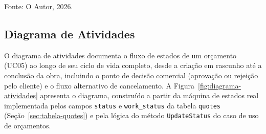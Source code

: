 \begin{figure}[H]
{
}
\end{figure}
{\centering\small Fonte: O Autor, 2026.\par}
\vspace{0.8em}

\subsection{Diagrama de Atividades}
\label{sec:diagrama-atividades}

O diagrama de atividades documenta o fluxo de estados de um orçamento (UC05) ao longo de seu ciclo de vida completo, desde a criação em rascunho até a conclusão da obra, incluindo o ponto de decisão comercial (aprovação ou rejeição pelo cliente) e o fluxo alternativo de cancelamento. A Figura~\ref{fig:diagrama-atividades} apresenta o diagrama, construído a partir da máquina de estados real implementada pelos campos \texttt{status} e \texttt{work\_status} da tabela \texttt{quotes} (Seção~\ref{sec:tabela-quotes}) e pela lógica do método \texttt{UpdateStatus} do caso de uso de orçamentos.

